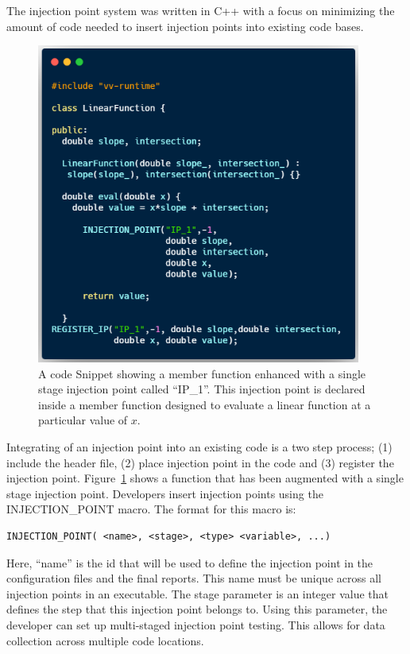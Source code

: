The injection point system was written in C++ with a focus on minimizing the amount of 
code needed to insert injection points into existing code bases. 

\begin{figure}
 \includegraphics[width=0.95\textwidth]{./narrative/figures/linear-func.png}
 \caption{A code Snippet showing a member function enhanced with a single stage injection point called ``IP\_1''. This injection point is declared inside a member function 
 designed to evaluate a linear function at a particular value of $x$. \label{fig:example}}
\end{figure}

Integrating of an injection point into an existing code is a two step process; (1) include the header file, (2) place injection point in the code and (3) register the injection point. Figure~\ref{fig:example} shows a function that has been augmented with a single stage injection point. Developers insert injection points using the INJECTION\_POINT macro. The format for this macro is:

\begin{verbatim} 
INJECTION_POINT( <name>, <stage>, <type> <variable>, ...)
\end{verbatim}

Here, ``name'' is the id that will be used to define the injection point in the configuration files and the final reports. This name must be unique across all injection points in an executable. The stage parameter is an integer value that defines the step that this injection point belongs to. Using this parameter, the developer can set up multi-staged injection point testing. This allows for data collection across multiple code locations. 


